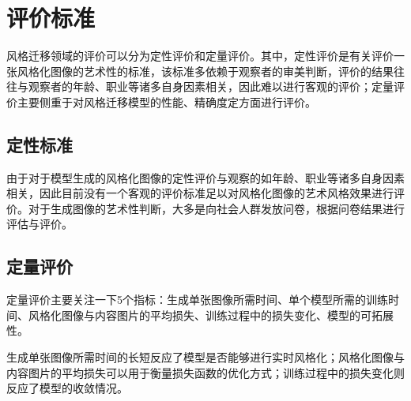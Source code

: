 \section{评价标准}

风格迁移领域的评价可以分为定性评价和定量评价。其中，定性评价是有关评价一张风格化图像的艺术性的标准，该标准多依赖于观察者的审美判断，评价的结果往往与观察者的年龄、职业等诸多自身因素相关，因此难以进行客观的评价；定量评价主要侧重于对风格迁移模型的性能、精确度定方面进行评价。

\subsection{定性标准}

由于对于模型生成的风格化图像的定性评价与观察的如年龄、职业等诸多自身因素相关，因此目前没有一个客观的评价标准足以对风格化图像的艺术风格效果进行评价。对于生成图像的艺术性判断，大多是向社会人群发放问卷，根据问卷结果进行评估与评价。

\subsection{定量评价}

定量评价主要关注一下5个指标：生成单张图像所需时间、单个模型所需的训练时间、风格化图像与内容图片的平均损失、训练过程中的损失变化、模型的可拓展性。

生成单张图像所需时间的长短反应了模型是否能够进行实时风格化；风格化图像与内容图片的平均损失可以用于衡量损失函数的优化方式；训练过程中的损失变化则反应了模型的收敛情况。
